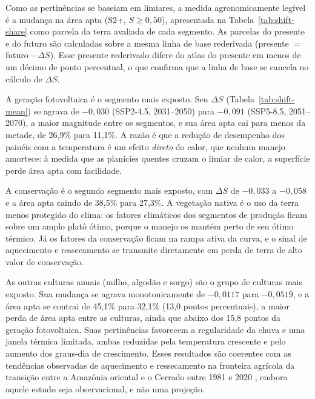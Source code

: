 \begin{table}[htbp]
\centering
\caption{Mudança média territorial projetada na aptidão, $\Delta S$ (futuro menos
presente), por segmento. Valores negativos indicam perda de aptidão.}
\label{tab:shift-mean}
\small

\end{table}

Como as pertinências se baseiam em limiares, a medida agronomicamente legível é a mudança
na área apta (S2+, $S \ge 0{,}50$), apresentada na Tabela~\ref{tab:shift-share} como parcela da terra
avaliada de cada segmento. As parcelas do presente e do futuro são calculadas sobre a mesma linha de
base rederivada (presente $=$ futuro $- \Delta S$). Esse presente rederivado difere do atlas do
presente em menos de um décimo de ponto percentual, o que confirma que a linha de base se cancela no
cálculo de $\Delta S$.

\begin{table}[htbp]
\centering
\caption{Parcela da terra avaliada de cada segmento classificada como apta
(S2+, $S \ge 0{,}50$), presente $\rightarrow$ futuro.}
\label{tab:shift-share}
\small

\end{table}

A geração fotovoltaica é o segmento mais exposto. Seu $\Delta S$ (Tabela~\ref{tab:shift-mean}) se
agrava de $-0{,}030$ (SSP2-4.5, 2031--2050) para $-0{,}091$ (SSP5-8.5, 2051--2070), a maior magnitude
entre os segmentos, e sua área apta cai para menos da metade, de 26,9\% para 11,1\%. A razão é que a
redução de desempenho dos painéis com a temperatura é um efeito \emph{direto} do calor, que nenhum
manejo amortece: à medida que as planícies quentes cruzam o limiar de calor, a superfície perde área
apta com facilidade.

A conservação é o segundo segmento mais exposto, com $\Delta S$ de $-0{,}033$ a $-0{,}058$ e a
área apta caindo de 38,5\% para 27,3\%. A vegetação nativa é o uso da terra menos
protegido do clima: os fatores climáticos dos segmentos de produção ficam sobre um amplo
platô ótimo, porque o manejo os mantém perto de seu ótimo térmico. Já os fatores da conservação ficam
na rampa ativa da curva, e o sinal de aquecimento e ressecamento se transmite diretamente em perda de
terra de alto valor de conservação.

As outras culturas anuais (milho, algodão e sorgo) são o grupo de culturas mais exposto. Sua
mudança se agrava monotonicamente de $-0{,}0117$ para $-0{,}0519$, e a área apta se contrai de 45,1\%
para 32,1\% (13,0 pontos percentuais), a maior perda de área apta entre as culturas, ainda que abaixo
dos 15,8 pontos da geração fotovoltaica. Suas pertinências favorecem a regularidade da chuva e uma
janela térmica limitada, ambas reduzidas pela temperatura crescente e pelo aumento dos graus-dia de
crescimento. Esses resultados são coerentes com as tendências observadas de aquecimento e
ressecamento na fronteira agrícola da transição entre a Amazônia oriental e o Cerrado entre 1981 e
2020 \citep[p.~4]{marengo_increased_2022}, embora aquele estudo seja observacional, e não uma projeção.


